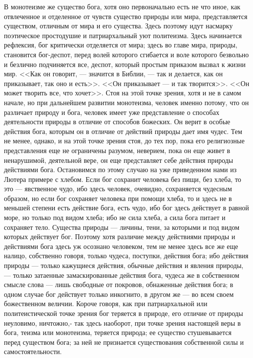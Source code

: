 \documentclass[12pt]{article}
\begin{document}
В монотеизме же существо бога, хотя оно первоначально есть не что иное, как отвлеченное и отделенное от чувств существо природы или мира, представляется существом, отличным от мира и его существа. Здесь поэтому идут насмарку поэтическое простодушие и патриархальный уют политеизма. Здесь начинается рефлексия, бог критически отделяется от мира; здесь во главе мира, природы, становится бог-деспот, перед волей которого сгибается и воле которого безвольно и безлично подчиняется все, деспот, который простым приказом вызвал к жизни мир. <<Как он говорит, --- значится в Библии, --- так и делается, как он приказывает, так оно и есть>>. <<Он приказывает --- и так творится>>. <<Он может творить все, что хочет>>. Стоя на этой точке зрения, хотя и не в самом начале, но при дальнейшем развитии монотеизма, человек именно потому, что он различает природу и бога, человек имеет уже представление о способах деятельности природы в отличие от способов божеских. Он верит в особые действия бога, которым он в отличие от действий природы дает имя чудес. Тем не менее, однако, и на этой точке зрения стоя, до тех пор, пока его религиозные представления еще не ограничены разумом, неверием, пока он еще живет в ненарушимой, деятельной вере, он еще представляет себе действия природы действиями бога. Остановимся по этому случаю на уже приведенном нами из Лютера примере с хлебом. Если бог сохранит человека без пищи, без хлеба, то это --- явственное чудо, ибо здесь человек, очевидно, сохраняется чудесным образом, но если бог сохраняет человека при помощи хлеба, то и здесь не в меньшей степени есть действие бога, есть чудо, ибо бог здесь действует в равной море, но только под видом хлеба; ибо не сила хлеба, а сила бога питает и сохраняет тело. Существа природы --- личины, тени, за которыми и под видом которых действует бог. Поэтому хотя различие между действиями природы и действиями бога здесь уж осознано человеком, тем не менее здесь все же еще налицо, собственно говоря, только чудеса, поступки, действия бога; ибо действия природы --- только кажущиеся действия, обычные действия и явления природы, --- только затаенные замаскированные действия бога, чудеса же в собственном смысле слова --- лишь свободные от покровов, обнаженные действия бога; в одном случае бог действует только инкогнито, в другом же --- во всем своем божественном величии. Короче говоря, как при патриархальной или политеистической точке зрения бог теряется в природе, его отличие от природы неуловимо, ничтожно,- так здесь наоборот, при точке зрения настоящей веры в бога, теизма или монотеизма, теряется природа; ее существо стушевывается перед существом бога; за ней не признается существования собственной силы и самостоятельности. 
\end{document}
